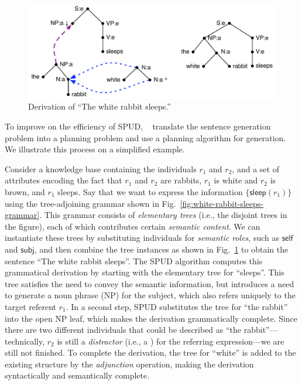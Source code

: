 \begin{figure}
  \centering
  \includegraphics[width=\columnwidth]{pic-derivation}
  \caption{Derivation of ``The white rabbit sleeps.''}
  \label{fig:white-rabbit-sleeps-deriv}
\end{figure}


To improve on the efficiency of SPUD,
\citeauthor{KolSto07}~ translate the sentence
generation problem into a planning problem and use a planning algorithm for
generation. We illustrate this process on a simplified example.

Consider a knowledge base containing the individuals $r_1$ and $r_2$, and a
set of attributes encoding the fact that $r_1$ and $r_2$ are rabbits, $r_1$
is white and $r_2$ is brown, and $r_1$ sleeps.  Say that we want to express
the information $\{\mathsf{sleep}(r_1)\}$ using the tree-adjoining grammar
shown in Fig.~\ref{fig:white-rabbit-sleeps-grammar}. This grammar consists
of \emph{elementary trees} (i.e., the disjoint trees in the figure), each
of which contributes certain \emph{semantic content}. We can instantiate
these trees by substituting individuals for \emph{semantic roles}, such as
$\mathsf{self}$ and $\mathsf{subj}$, and then combine the tree instances as
shown in Fig.~\ref{fig:white-rabbit-sleeps-deriv} to obtain the sentence
``The white rabbit sleeps''. The SPUD algorithm computes this grammatical
derivation by starting with the elementary tree for ``sleeps''. This tree
satisfies the need to convey the semantic information, but introduces a
need to generate a noun phrase (NP) for the subject, which also refers
uniquely to the target referent $r_1$. In a second step, SPUD substitutes
the tree for ``the rabbit'' into the open NP leaf, which makes the
derivation grammatically complete. Since there are two different
individuals that could be described as ``the rabbit''---technically, $r_2$
is still a \emph{distractor} (i.e., a ) for
the referring expression---we are still not finished. To complete the
derivation, the tree for ``white'' is added to the existing structure by
the \emph{adjunction} operation, making the derivation syntactically and
semantically complete.


